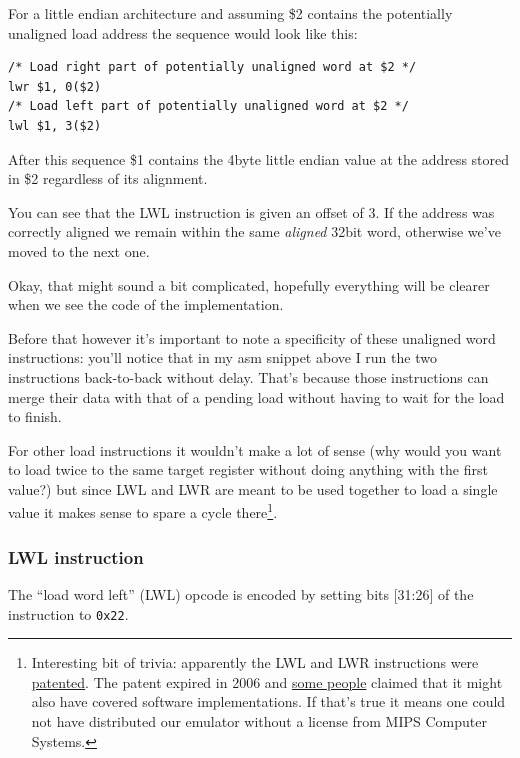 \documentclass[a4paper]{article}
\newcommand{\code}[1] {\texttt{#1}}
\begin{document}
For a little endian architecture and assuming \$2 contains the
potentially unaligned load address the sequence would look like this:

\begin{lstlisting}[language=assembly]
/* Load right part of potentially unaligned word at $2 */
lwr $1, 0($2)
/* Load left part of potentially unaligned word at $2 */
lwl $1, 3($2)
\end{lstlisting}

After this sequence \$1 contains the 4byte little endian value at the
address stored in \$2 regardless of its alignment.

You can see that the LWL instruction is given an offset of 3. If the
address was correctly aligned we remain within the same \emph{aligned}
32bit word, otherwise we've moved to the next one.

Okay, that might sound a bit complicated, hopefully everything will be
clearer when we see the code of the implementation.

Before that however it's important to note a specificity of these
unaligned word instructions: you'll notice that in my asm snippet
above I run the two instructions back-to-back without delay. That's
because those instructions can merge their data with that of a pending
load without having to wait for the load to finish.

For other load instructions it wouldn't make a lot of sense (why would
you want to load twice to the same target register without doing
anything with the first value?) but since LWL and LWR are meant to be
used together to load a single value it makes sense to spare a cycle
there\footnote{Interesting bit of trivia: apparently the LWL and LWR
  instructions were
  \href{https://encrypted.google.com/patents/US4814976}{patented}. The
  patent expired in 2006 and
  \href{https://www.linux-mips.org/archives/linux-mips/2003-05/msg00189.html}{some
    people} claimed that it might also have covered software
  implementations. If that's true it means one could not have
  distributed our emulator without a license from MIPS Computer
  Systems.}.

\subsubsection{LWL instruction}

The ``load word left'' (LWL) opcode is encoded by setting bits [31:26]
of the instruction to \code{0x22}.
\end{document}
